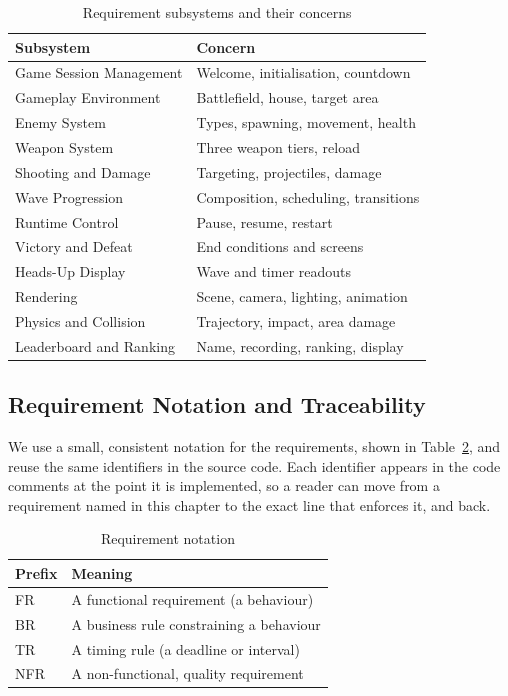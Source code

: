 \documentclass[12pt,a4paper]{report}
\begin{document}
\begin{table}[htbp]
\centering
\caption{Requirement subsystems and their concerns}
\label{tab:subsystems}
\begin{tabular}{|p{5.5cm}|p{7.0cm}|}
\hline
Subsystem & Concern \\
\hline
Game Session Management & Welcome, initialisation, countdown \\
\hline
Gameplay Environment & Battlefield, house, target area \\
\hline
Enemy System & Types, spawning, movement, health \\
\hline
Weapon System & Three weapon tiers, reload \\
\hline
Shooting and Damage & Targeting, projectiles, damage \\
\hline
Wave Progression & Composition, scheduling, transitions \\
\hline
Runtime Control & Pause, resume, restart \\
\hline
Victory and Defeat & End conditions and screens \\
\hline
Heads-Up Display & Wave and timer readouts \\
\hline
Rendering & Scene, camera, lighting, animation \\
\hline
Physics and Collision & Trajectory, impact, area damage \\
\hline
Leaderboard and Ranking & Name, recording, ranking, display \\
\hline
\end{tabular}
\end{table}

\subsection{Requirement Notation and Traceability}

We use a small, consistent notation for the requirements, shown in
Table~\ref{tab:notation}, and reuse the same identifiers in the source code.
Each identifier appears in the code comments at the point it is implemented, so a
reader can move from a requirement named in this chapter to the exact line that
enforces it, and back.

\begin{table}[htbp]
\centering
\caption{Requirement notation}
\label{tab:notation}
\begin{tabular}{|p{2.6cm}|p{9.0cm}|}
\hline
Prefix & Meaning \\
\hline
FR & A functional requirement (a behaviour) \\
\hline
BR & A business rule constraining a behaviour \\
\hline
TR & A timing rule (a deadline or interval) \\
\hline
NFR & A non-functional, quality requirement \\
\hline
\end{tabular}
\end{table}
\end{document}
